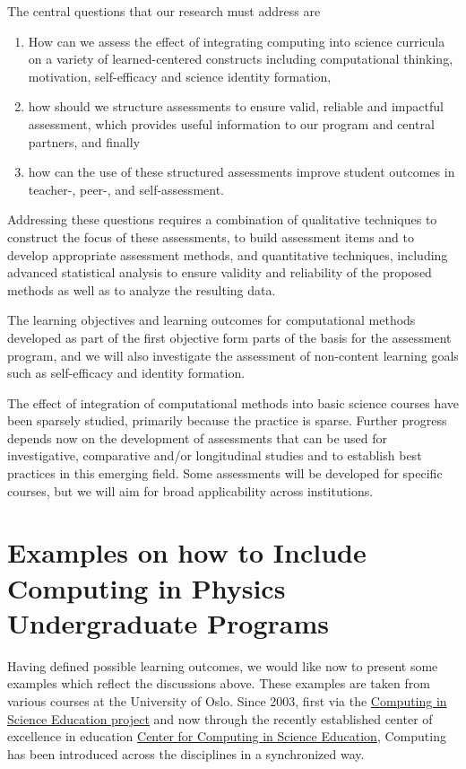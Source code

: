\documentclass[graybox,envcountchap,sectrefs]{svmult}
\begin{document}
The central questions that our research must address are 
\begin{enumerate}
\item How can we assess the effect of integrating computing into science curricula on a variety of learned-centered constructs including computational thinking, motivation, self-efficacy and science identity formation, 
\item how should we structure assessments to ensure valid, reliable and impactful assessment, which provides useful information to our program and central partners, and finally 
\item how can the use of these structured assessments improve student outcomes in teacher-, peer-, and self-assessment.
\end{enumerate}


Addressing these questions requires a combination of qualitative
techniques to construct the focus of these assessments, to build
assessment items and to develop appropriate assessment methods, and
quantitative techniques, including advanced statistical analysis to
ensure validity and reliability of the proposed methods as well as to
analyze the resulting data.

The learning objectives and learning outcomes for computational
methods developed as part of the first objective form parts of the
basis for the assessment program, and we will also investigate the
assessment of non-content learning goals such as self-efficacy and
identity formation. 

The effect of integration of computational methods into basic science
courses have been sparsely studied, primarily because the practice is
sparse. Further progress depends now on the development of assessments
that can be used for investigative, comparative and/or longitudinal
studies and to establish best practices in this emerging field.  Some
assessments will be developed for specific courses, but we will aim
for broad applicability across institutions.

\section{Examples on how to Include Computing in Physics Undergraduate Programs}

Having defined possible learning outcomes, we would like now to
present some examples which reflect the discussions above. These
examples are taken from various courses at the University of
Oslo. Since 2003, first via the
\href{{http://www.mn.uio.no/ccse/english/people/index.html}}{Computing
  in Science Education project} and now through the recently
established center of excellence in education
\href{{http://www.mn.uio.no/ccse/english/}}{Center for Computing in
  Science Education}, Computing has been introduced across the
disciplines in a synchronized way.
\end{document}
